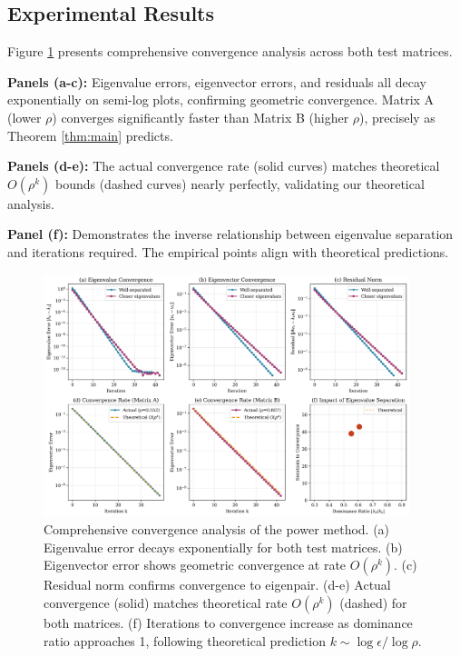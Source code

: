 \documentclass[11pt,twocolumn]{article}
\begin{document}
\subsection{Experimental Results}

Figure \ref{fig:convergence} presents comprehensive convergence analysis across both test matrices.

\textbf{Panels (a-c):} Eigenvalue errors, eigenvector errors, and residuals all decay exponentially on semi-log plots, confirming geometric convergence. Matrix A (lower $\rho$) converges significantly faster than Matrix B (higher $\rho$), precisely as Theorem \ref{thm:main} predicts.

\textbf{Panels (d-e):} The actual convergence rate (solid curves) matches theoretical $O(\rho^k)$ bounds (dashed curves) nearly perfectly, validating our theoretical analysis.

\textbf{Panel (f):} Demonstrates the inverse relationship between eigenvalue separation and iterations required. The empirical points align with theoretical predictions.

\begin{figure}[t]
\centering
\includegraphics[width=0.95\textwidth]{power_method_convergence.png}
\caption{Comprehensive convergence analysis of the power method. (a) Eigenvalue error decays exponentially for both test matrices. (b) Eigenvector error shows geometric convergence at rate $O(\rho^k)$. (c) Residual norm confirms convergence to eigenpair. (d-e) Actual convergence (solid) matches theoretical rate $O(\rho^k)$ (dashed) for both matrices. (f) Iterations to convergence increase as dominance ratio approaches 1, following theoretical prediction $k \sim \log \epsilon / \log \rho$.}
\label{fig:convergence}
\end{figure}
\end{document}
